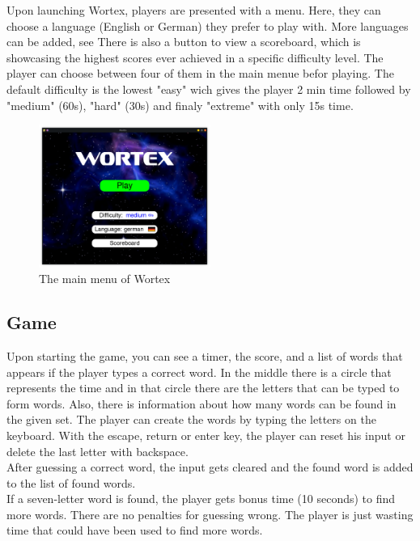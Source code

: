 \documentclass{article}[12pt]
\begin{document}
    Upon launching Wortex, players are presented with a menu. Here, they can
    choose a language (English or German) they prefer to play with. More languages can be added, see  There is also
    a button to view a scoreboard, which is showcasing the highest scores ever
    achieved in a specific difficulty level. The player can choose between four of them in the main menue befor playing. The default difficulty is the lowest "easy" wich gives the player 2 min time followed by "medium" (60s), "hard" (30s) and finaly "extreme" with only 15s time.
    \newpage

    \begin{figure}[ht]
        \centering
        \includegraphics[width=0.5\textwidth]{pictures/menu.png}
        \caption{The main menu of Wortex}
    \end{figure}

    \subsection*{Game}

    Upon starting the game, you can
    see a timer, the score, and a list of words that appears if the player
    types a correct word. In the middle there is a circle that represents the
    time and in that circle there are the letters that can be typed to form
    words. Also, there is information about how many words can be found in the
    given set. The player can create the words by typing the letters on the
    keyboard. With the escape, return or enter key, the player can reset his input or delete the last letter with backspace.\\
    After guessing a correct word, the input gets cleared and the found word is
    added to the list of found words.\\ If a seven-letter word is found, the
    player gets bonus time (10 seconds) to find more words. There are no penalties for guessing wrong. The player is just wasting
    time that could have been used to find more words. 
\end{document}
